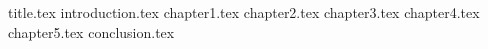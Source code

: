 \documentclass[a4paper,14pt]{extarticle}
\begin{document}
	 {title.tex}
	\clearpage
	\setcounter{page}{2}
	\tableofcontents
	\clearpage
	 {introduction.tex}
	\clearpage
	 {chapter1.tex}
	\clearpage
	 {chapter2.tex}
	\clearpage
	 {chapter3.tex}
	\clearpage
            {chapter4.tex}
	\clearpage
            {chapter5.tex}
	\clearpage
	 {conclusion.tex}
	\clearpage
	\renewcommand{\refname}{Список использованных источников}
	
           
\end{document}
